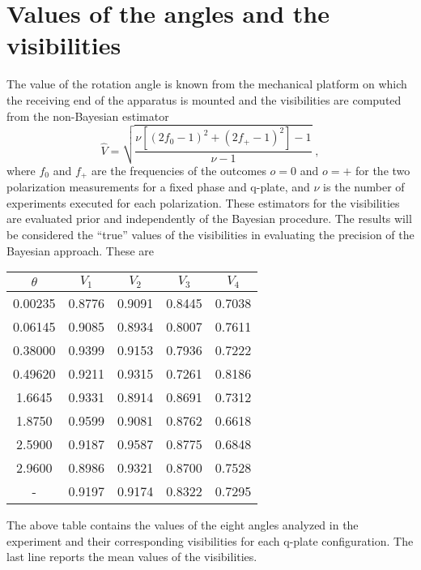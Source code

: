 \documentclass[superscriptaddress,notitlepage,pra]{revtex4-1}
\begin{document}
\section{Values of the angles and the visibilities}
\label{sec:values}
%
The value of the rotation angle is known from the mechanical platform on which the receiving end of the apparatus is mounted and the visibilities are computed from the non-Bayesian estimator
%
\begin{equation}
    \hat{V} = \sqrt{\frac{\nu \left[ \left(2 f_0 -1 \right)^2 + (2 f_+ -1)^2 \right] -1}{\nu -1}} \; ,
\end{equation}
%
where $f_0$ and $f_+$ are the frequencies of the outcomes $o=0$ and $o=+$ for the two polarization measurements for a fixed phase and q-plate, and $\nu$ is the number of experiments executed for each polarization. These estimators for the visibilities are evaluated prior and independently of the Bayesian procedure. The results will be considered the ``true'' values of the visibilities in evaluating the precision of the Bayesian approach. These are
%
\begin{center}
    \begin{tabular}{ |c|c|c|c|c| } 
    \hline
    $\theta$ & $V_1$ & $V_2$ & $V_3$ & $V_4$\\
    \hline
    0.00235 & 0.8776 & 0.9091 & 0.8445 & 0.7038\\ 0.06145 & 0.9085 & 0.8934 & 0.8007 & 0.7611\\
    0.38000 & 0.9399 & 0.9153 & 0.7936 & 0.7222\\
    0.49620 & 0.9211 & 0.9315 & 0.7261 & 0.8186\\
    1.6645 & 0.9331 & 0.8914 & 0.8691 & 0.7312\\
    1.8750 & 0.9599 & 0.9081 & 0.8762 & 0.6618\\
    2.5900 & 0.9187 & 0.9587 & 0.8775 & 0.6848\\
    2.9600 & 0.8986 & 0.9321 & 0.8700 & 0.7528\\
    - & 0.9197 & 0.9174 & 0.8322 & 0.7295\\
    \hline
    \end{tabular}
    \label{tab:visibilities}
\end{center}
%
The above table contains the values of the eight angles analyzed in the experiment and their corresponding visibilities for each q-plate configuration. The last line reports the mean values of the visibilities.


\end{document}
